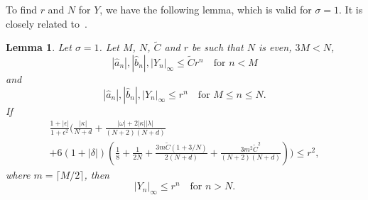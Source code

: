 \documentclass[11pt]{article}
\newtheorem{lemma}[definition]{Lemma}
\begin{document}
To find \(r\) and \(N\) for \(Y\), we have the following lemma, which
is valid for \(\sigma = 1\). It is closely related
to~\cite[Lemma~8.1]{Dahne2024}.

\begin{lemma}\label{lemma:tail-bound-Y}
  Let \(\sigma = 1\). Let \(M\), \(N\), \(\tilde{C}\) and \(r\) be such
  that \(N\) is even, \(3M < N\),
  \begin{equation*}
    |\hat{a}_{n}|, |\hat{b}_{n}|, |Y_{n}|_{\infty} \leq \tilde{C} r^{n} \quad\text{for } n < M
  \end{equation*}
  and
  \begin{equation*}
    |\hat{a}_{n}|, |\hat{b}_{n}|, |Y_{n}|_{\infty} \leq r^{n} \quad\text{for } M \leq n \leq N.
  \end{equation*}
  If
  \begin{multline}
    \label{eq:tail-bound-inequality-Y}
    \frac{1 + |\epsilon|}{1 + \epsilon^{2}}\Bigg(
      \frac{|\kappa|}{N + d}
      + \frac{|\omega| + 2|\kappa||\lambda|}{(N + 2)(N + d)}\\
      + 6(1 + |\delta|)\left(
        \frac{1}{8} + \frac{1}{2N}
        + \frac{3m\tilde{C}(1 + 3/N)}{2(N + d)}
        + \frac{3m^{2}\tilde{C}^{2}}{(N + 2)(N + d)}
      \right)
    \Bigg) \leq r^{2},
  \end{multline}
  where \(m = \lceil M / 2 \rceil\), then
  \begin{equation*}
    |Y_{n}|_{\infty} \leq r^{n} \quad\text{for } n > N.
  \end{equation*}
\end{lemma}
\end{document}
